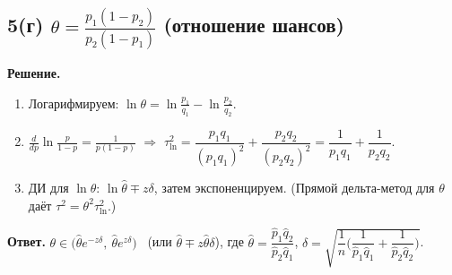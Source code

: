 \documentclass[12pt,a4paper]{article}
\newcommand{\sol}{\par\noindent\textbf{Решение.} }
\newcommand{\ans}{\par\smallskip\noindent\textbf{Ответ.} }
\begin{document}
\subsection*{5(г) \quad $\theta=\frac{p_1(1-p_2)}{p_2(1-p_1)}$ (отношение шансов)}
\sol
\begin{enumerate}
  \item Логарифмируем: $\ln\theta=\ln\frac{p_1}{q_1}-\ln\frac{p_2}{q_2}$.
  \item $\frac{d}{dp}\ln\frac p{1-p}=\frac1{p(1-p)}$ $\Rightarrow$
        $\tau^2_{\ln}=\dfrac{p_1q_1}{(p_1q_1)^2}+\dfrac{p_2q_2}{(p_2q_2)^2}
        =\dfrac1{p_1q_1}+\dfrac1{p_2q_2}$.
  \item ДИ для $\ln\theta$: $\ln\hat\theta\mp z\delta$, затем экспоненцируем.
        (Прямой дельта-метод для $\theta$ даёт $\tau^2=\theta^2\tau^2_{\ln}$.)
\end{enumerate}
\ans $\theta\in\big(\hat\theta e^{-z\delta},\ \hat\theta e^{z\delta}\big)$
     \ (или $\hat\theta\mp z\hat\theta\delta$), где
     $\hat\theta=\dfrac{\hat p_1\hat q_2}{\hat p_2\hat q_1}$,
     $\delta=\sqrt{\dfrac1n\Big(\dfrac1{\hat p_1\hat q_1}+\dfrac1{\hat p_2\hat q_2}\Big)}$.
\end{document}
